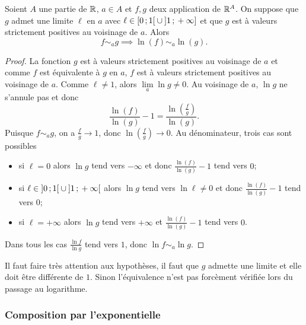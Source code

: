 \begin{prop}
  Soient \(A\) une partie de \(\mathbb{R}\), \(a \in A\) et \(f, g\) deux application de 
  \(\mathbb{R}^A\). On suppose que \(g\) admet une limite \(\ell\) en \(a\) avec \(\ell 
  \in \left[ 0 \, ; {} 1 \right[ \cup \left] 1 \, ; {} +\infty \right]\) et que \(g\) est à 
  valeurs strictement positives au voisinage de \(a\). Alors
  \begin{equation}
    f \sim_a g \implies \ln(f) \sim_a \ln(g).
  \end{equation}
\end{prop}
\begin{proof}
  La fonction \(g\) est à valeurs strictement positives au voisinage de \(a\) et 
  comme \(f\) est équivalente à \(g\) en \(a\), \(f\) est à valeurs strictement 
  positives au voisinage de \(a\). Comme \(\ell \neq 1\), alors 
  \(\lim\limits_{a} \ln g \neq 0\). Au voisinage de \(a\), \(\ln g\) ne s'annule 
  pas et donc
  \begin{equation}
    \frac{\ln(f)}{\ln(g)}-1=\frac{\ln\left(\frac{f}{g}\right)}{\ln(g)}.
  \end{equation}
  Puisque \(f \sim_a g\), on a \(\frac{f}{g} \to 1\), donc 
  \(\ln\left(\frac{f}{g}\right) \to 0\). Au dénominateur, trois cas sont 
  possibles
  \begin{itemize}
    \item si \(\ell =0\) alors \(\ln g\) tend vers \(-\infty\) et donc 
      \(\frac{\ln(f)}{\ln(g)}-1\) tend vers \(0\);
    \item si \(\ell \in \left] 0 \, ; {} 1 \right[ \cup \left] 1 \, ; {} +\infty \right[\) 
      alors \(\ln g\) tend vers \(\ln \ell \neq 0\) et donc 
      \(\frac{\ln(f)}{\ln(g)}-1\) tend vers \(0\);
    \item si \(\ell = +\infty\) alors \(\ln g\) tend vers \(+\infty\) et 
      \(\frac{\ln(f)}{\ln(g)}-1\) tend vers \(0\).
  \end{itemize}
  Dans tous les cas \(\frac{\ln f}{\ln g}\) tend vers \(1\), donc \(\ln f \sim_a 
  \ln g\).
\end{proof}

Il faut faire très attention aux hypothèses, il faut que \(g\) admette une 
limite et elle doit être différente de \(1\). Sinon l'équivalence n'est pas 
forcèment vérifiée lors du passage au logarithme.

\subsubsection{Composition par l'exponentielle}

